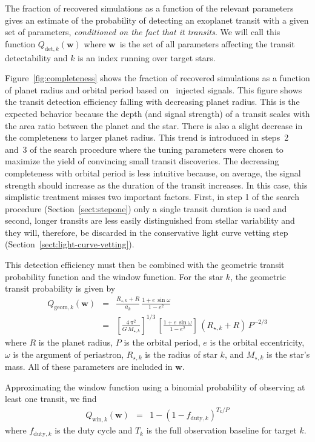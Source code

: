 \documentclass[manuscript, letterpaper]{aastex6}
\newcommand{\dfmfigref}[1]{\ref{fig:#1}}
\newcommand{\dfmFig}[1]{Figure~\dfmfigref{#1}}
\newcommand{\dfmfig}[1]{\dfmFig{#1}}
\newcommand{\sectionname}{Section}
\newcommand{\sectref}[1]{\ref{sect:#1}}
\newcommand{\Sect}[1]{\sectionname~\sectref{#1}}
\newcommand{\sect}[1]{\Sect{#1}}
\newcommand{\bvec}[1]{{\ensuremath{\boldsymbol{#1}}}}
\newcommand{\params}{{\ensuremath{\bvec{w}}}}
\begin{document}
The fraction of recovered simulations as a function of the relevant parameters
gives an estimate of the probability of detecting an exoplanet transit with a
given set of parameters, \emph{conditioned on the fact that it transits}.
We will call this function $Q_{\mathrm{det},k}(\params)$ where \params\ is the
set of all parameters affecting the transit detectability and $k$ is an index
running over target stars.

\dfmfig{completeness} shows the fraction of recovered simulations as a
function of planet radius and orbital period based on \numinjs\ injected
signals.
This figure shows the transit detection efficiency falling with decreasing
planet radius.
This is the expected behavior because the depth (and signal strength) of a
transit scales with the area ratio between the planet and the star.
There is also a slight decrease in the completeness to larger planet radius.
This trend is introduced in steps~2 and~3 of the search procedure where the
tuning parameters were chosen to maximize the yield of convincing small
transit discoveries.
The decreasing completeness with orbital period is less intuitive because, on
average, the signal strength should increase as the duration of the transit
increases.
In this case, this simplistic treatment misses two important factors.
First, in step 1 of the search procedure (\sect{stepone}) only a single
transit duration is used and second, longer transits are less easily
distinguished from stellar variability and they will, therefore, be discarded
in the conservative light curve vetting step (\sect{light-curve-vetting}).

This detection efficiency must then be combined with the geometric transit
probability function and the window function.
For the star $k$, the geometric transit probability is given by
\citep{Winn:2010}
\begin{eqnarray}
Q_{\mathrm{geom},k} (\params) &=& \frac{R_{\star,k} + R}{a_k}
    \, \frac{1 + e\,\sin\omega}{1-e^2} \\
&=& \left[\frac{4\,\pi^2}{G\,M_{\star,k}}\right]^{1/3}
    \, \left[\frac{1 + e\,\sin \omega}{1-e^2}\right]\,(R_{\star,k}+R)
    \, P^{-2/3}
\end{eqnarray}
where $R$ is the planet radius, $P$ is the orbital period, $e$ is the orbital
eccentricity, $\omega$ is the argument of periastron, $R_{\star,k}$ is
the radius of star $k$, and $M_{\star,k}$ is the star's mass.
All of these parameters are included in \params.

Approximating the window function using a binomial probability of observing
at least one transit, we find \citep[following][]{Burke:2014a}
\begin{eqnarray}
Q_{\mathrm{win},k} (\params) &=& 1 - (1 - f_{\mathrm{duty},k})^{T_k/P}
\end{eqnarray}
where $f_{\mathrm{duty},k}$ is the duty cycle and $T_k$ is the full
observation baseline for target $k$.
\end{document}
